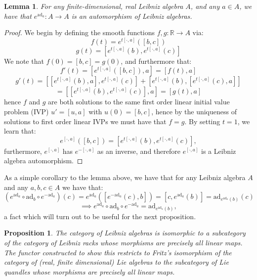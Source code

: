 \documentclass[12pt]{amsart}
\theoremstyle{plain}
\newtheorem{lemma}[theorem]{Lemma}
\newtheorem{proposition}[theorem]{Proposition}
\theoremstyle{definition}
\begin{document}
\vspace{5mm}

 

\begin{lemma}
     For any finite-dimensional, real Leibniz algebra $A$, and any $a \in A$, we have that $e^{ \text{ad}_a} :A \to A $ is an automorphism of Leibniz algebras.
     \end{lemma}
     
\begin{proof}
 We begin by defining the smooth functions $f,g : \mathbb{R}\to A$ via:
$$ f(t) = e^{t [\cdot,a]}([b,c]) $$
$$ g(t) = [e^{t [\cdot,a]}(b),e^{t [\cdot,a]}(c)] $$
We note that $f(0) = [b,c] = g(0)$, and furthermore that:
$$ f'(t) = [e^{t [\cdot,a]}([b,c]),a] = [f(t),a] $$
$$ g'(t) = [[e^{t [\cdot,a]}(b),a],e^{t [\cdot,a]}(c)]+[e^{t [\cdot,a]}(b),[e^{t [\cdot,a]}(c),a]] $$
$$= [[e^{t [\cdot,a]}(b),e^{t [\cdot,a]}(c)],a]  = [g(t),a] $$
hence $f$ and $g$ are both solutions to the same first order linear initial value problem (IVP) $u' = [u,a]$ with $u(0) = [b,c]$, hence by the uniqueness of solutions to first order linear IVPs we must have that $f=g$. By setting $t=1$, we learn that: $$ e^{ [\cdot,a]}([b,c]) = [e^{t [\cdot,a]}(b),e^{t [\cdot,a]}(c)],$$
furthermore, $e^{[\cdot,a]}$ has $e^{-[\cdot,a]}$ as an inverse, and therefore $e^{[\cdot,a]}$ is a Leibniz algebra automorphism.
    
\end{proof}

As a simple corollary to the lemma above, we have that for any Leibniz algebra $A$ and any $a,b,c \in A$ we have that:
$$ (e^{\text{ad}_a} \circ \text{ad}_b \circ e^{-\text{ad}_a})(c) = e^{\text{ad}_a}([e^{-\text{ad}_a}(c),b]) = [c,e^{\text{ad}_a}(b)] = \text{ad}_{e^{\text{ad}_a}(b)}(c) $$
$$ \implies e^{\text{ad}_a} \circ \text{ad}_b \circ e^{-\text{ad}_a} = \text{ad}_{e^{\text{ad}_a}(b)}, $$
a fact which will turn out to be useful for the next proposition.


\begin{proposition}
The category of Leibniz algebras is isomorphic to a subcategory of the category of Leibniz racks whose morphisms are precisely all linear maps. The functor constructed to show this restricts to Fritz's isomorphism of the category of (real, finite dimensional) Lie algebras to the subcategory of Lie quandles whose morphisms are precisely all linear maps.
\end{proposition}
\end{document}
